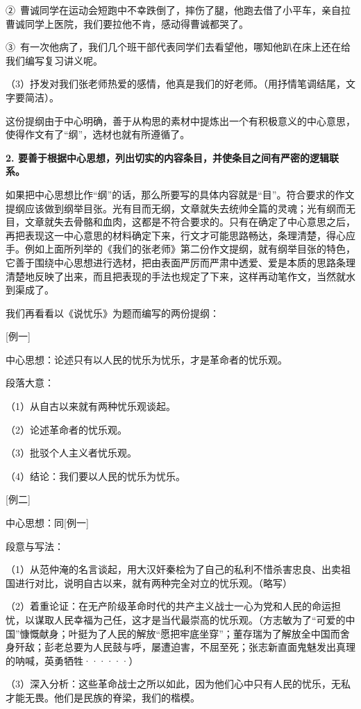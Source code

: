 ②\ 曹诚同学在运动会短跑中不幸跌倒了，摔伤了腿，他跑去借了小平车，亲自拉曹诚同学上医院，我们要拉他不肯，感动得曹诚都哭了。

③\ 有一次他病了，我们几个班干部代表同学们去看望他，哪知他趴在床上还在给我们编写复习讲义呢。

（3）抒发对我们张老师热爱的感情，他真是我们的好老师。（用抒情笔调结尾，文字要简洁）。

这份提纲由于中心明确，善于从构思的素材中提炼出一个有积极意义的中心意思，使得作文有了“纲”，选材也就有所遵循了。

\textbf{2. 要善于根据中心思想，列出切实的内容条目，并使条目之间有严密的逻辑联系。}

如果把中心思想比作“纲”的话，那么所要写的具体内容就是“目”。符合要求的作文提纲应该做到纲举目张。光有目而无纲，文章就失去统帅全篇的灵魂；光有纲而无目，文章就失去骨骼和血肉，这都是不符合要求的。只有在确定了中心意思之后，再把表现这一中心意思的材料确定下来，行文才可能思路畅达，条理清楚，得心应手。例如上面所列举的《我们的张老师》第二份作文提纲，就有纲举目张的特色，它善于围绕中心思想进行选材，把由表面严厉而严肃中透爱、爱是本质的思路条理清楚地反映了出来，而且把表现的手法也规定了下来，这样再动笔作文，当然就水到渠成了。

我们再看看以《说忧乐》为题而编写的两份提纲：

[例一]

中心思想：论述只有以人民的忧乐为忧乐，才是革命者的忧乐观。

段落大意：

（1）从自古以来就有两种忧乐观谈起。

（2）论述革命者的忧乐观。

（3）批驳个人主义者忧乐观。

（4）结论：我们要以人民的忧乐为忧乐。

[例二]

中心思想：同[例一]

段意与写法：

（1）从范仲淹的名言谈起，用大汉奸秦桧为了自己的私利不惜杀害忠良、出卖祖国进行对比，说明自古以来，就有两种完全对立的忧乐观。（略写）

（2）着重论证：在无产阶级革命时代的共产主义战士一心为党和人民的命运担忧，以谋取人民幸福为己任，这才是当代最崇高的忧乐观。（方志敏为了“可爱的中国”慷慨献身；叶挺为了人民的解放“愿把牢底坐穿”；董存瑞为了解放全中国而舍身歼敌；彭老总要为人民鼓与呼，屡遭迫害，不屈至死；张志新直面鬼魅发出真理的呐喊，英勇牺牲······）

（3）深入分析：这些革命战士之所以如此，因为他们心中只有人民的忧乐，无私才能无畏。他们是民族的脊梁，我们的楷模。

